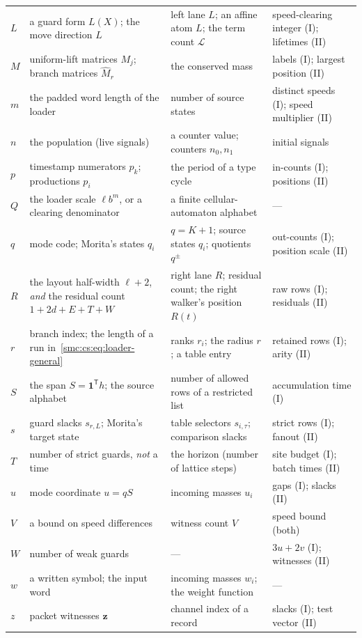 \documentclass[11pt,letterpaper]{article}
\numberwithin{equation}{section}
\theoremstyle{definition}
\theoremstyle{remark}
\newcommand{\one}{\mathbf 1}\newcommand{\set}[1]{\{#1\}}
\begin{document}
\begin{center}
\begin{longtable}{@{}L{0.06\textwidth}L{0.33\textwidth}L{0.31\textwidth}L{0.22\textwidth}@{}}
$L$ & a guard form $L(X)$; the move direction $L$ & left lane $L$; an affine atom $L$; the term count $\mathcal L$ & speed-clearing integer (I); lifetimes (II)\\
$M$ & uniform-lift matrices $M_j$; branch matrices $\widehat M_r$ & the conserved mass & labels (I); largest position (II)\\
$m$ & the padded word length of the loader & number of source states & distinct speeds (I); speed multiplier (II)\\
$n$ & the population (live signals) & a counter value; counters $n_0,n_1$ & initial signals\\
$p$ & timestamp numerators $p_k$; productions $p_i$ & the period of a type cycle & in-counts (I); positions (II)\\
$Q$ & the loader scale $\ell b^m$, or a clearing denominator & a finite cellular-automaton alphabet & ---\\
$q$ & mode code; Morita's states $q_i$ & $q=K+1$; source states $q_i$; quotients $q^\pm$ & out-counts (I); position scale (II)\\
$R$ & the layout half-width $\ell+2$, \emph{and} the residual count $1+2d+E+T+W$ & right lane $R$; residual count; the right walker's position $R(t)$ & raw rows (I); residuals (II)\\
$r$ & branch index; the length of a run in~\eqref{smc:cs:eq:loader-general} & ranks $r_i$; the radius $r$; a table entry & retained rows (I); arity (II)\\
$S$ & the span $S=\one^{\mathsf T}h$; the source alphabet & number of allowed rows of a restricted list & accumulation time (I)\\
$s$ & guard slacks $s_{r,L}$; Morita's target state & table selectors $s_{i,\tau}$; comparison slacks & strict rows (I); fanout (II)\\
$T$ & number of strict guards, \emph{not} a time & the horizon (number of lattice steps) & site budget (I); batch times (II)\\
$u$ & mode coordinate $u=qS$ & incoming masses $u_i$ & gaps (I); slacks (II)\\
$V$ & a bound on speed differences & witness count $V$ & speed bound (both)\\
$W$ & number of weak guards & --- & $3u+2v$ (I); witnesses (II)\\
$w$ & a written symbol; the input word & incoming masses $w_i$; the weight function & ---\\
$z$ & packet witnesses $\mathbf z$ & channel index of a record & slacks (I); test vector (II)\\
\bottomrule
\end{longtable}
\addtocounter{table}{-1}
\end{center}
\end{document}
